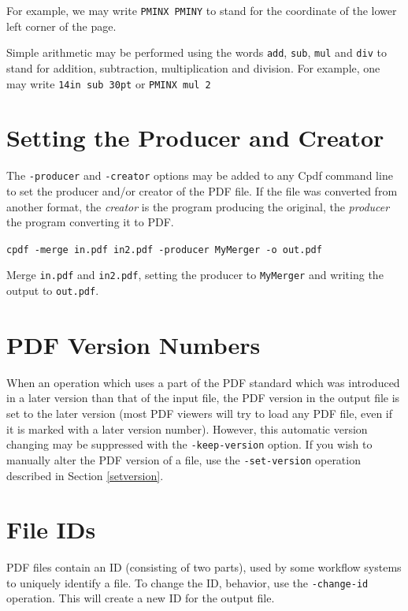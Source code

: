 \documentclass{book}
\begin{document}
\noindent For example, we may write \texttt{PMINX}\ \texttt{PMINY} to stand for the coordinate of the lower left corner of the page.

Simple arithmetic may be performed using the words \texttt{add}, \texttt{sub}, \texttt{mul} and \texttt{div} to stand for addition, subtraction, multiplication and division. For example, one may write \texttt{14in\hspace{-1mm} sub\hspace{-1mm} 30pt} or \texttt{PMINX\hspace{-1mm} mul\hspace{-1mm} 2}

\section{Setting the Producer and Creator}
The \texttt{-producer} and \texttt{-creator} options may be added to any Cpdf command line to set the producer and/or creator of the PDF file. If the file was converted from another format, the \textit{creator} is the program producing the original, the \textit{producer} the program converting it to PDF.

\begin{framed}
  \noindent\small\verb!cpdf -merge in.pdf in2.pdf -producer MyMerger -o out.pdf!

  \vspace{2.5mm}
  \noindent Merge \texttt{in.pdf} and \texttt{in2.pdf}, setting the producer to \texttt{MyMerger} and writing the output to \texttt{out.pdf}.\end{framed}

\section{PDF Version Numbers}
When an operation which uses a part of the PDF standard which was introduced in
a later version than that of the input file, the PDF version in the output file
is set to the later version (most PDF viewers will try to load any PDF file,
even if it is marked with a later version number). However, this automatic
version changing may be suppressed with the \texttt{-keep-version} option. If you wish to manually alter the PDF version of a file, use the
\texttt{-set-version} operation described in Section \ref{setversion}.

\section{File IDs}
PDF files contain an ID (consisting of two parts), used by some workflow
systems to uniquely identify a file. To change the ID, behavior, use the
\texttt{-change-id} operation. This will create a new ID for the output file. 
\end{document}
